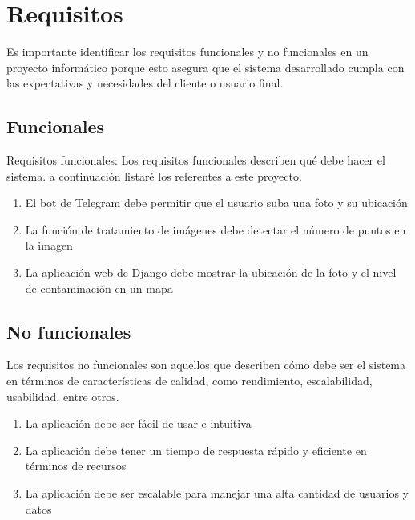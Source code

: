 \chapter{Requisitos}\label{Int}
\fancyhf{}%
\fancyfoot[L]{\thepage} 
Es importante identificar los requisitos funcionales y no funcionales en un proyecto informático porque esto asegura que el sistema desarrollado cumpla con las expectativas y necesidades del cliente o usuario final.
\section{Funcionales}Requisitos funcionales:
Los requisitos funcionales describen qué debe hacer el sistema.
a continuación listaré los referentes a este proyecto.
\begin{enumerate}
    \item El bot de Telegram debe permitir que el usuario suba una foto y su ubicación
    \item La función de tratamiento de imágenes debe detectar el número de puntos en la imagen
    \item La aplicación web de Django debe mostrar la ubicación de la foto y el nivel de contaminación en un mapa
\end{enumerate}


\section{No funcionales}
Los requisitos no funcionales son aquellos que describen cómo debe ser el sistema en términos de características de calidad, como rendimiento, escalabilidad, usabilidad, entre otros.
\begin{enumerate}
    \item La aplicación debe ser fácil de usar e intuitiva
    \item La aplicación debe tener un tiempo de respuesta rápido y eficiente en términos de recursos
    \item La aplicación debe ser escalable para manejar una alta cantidad de usuarios y datos
\end{enumerate}

